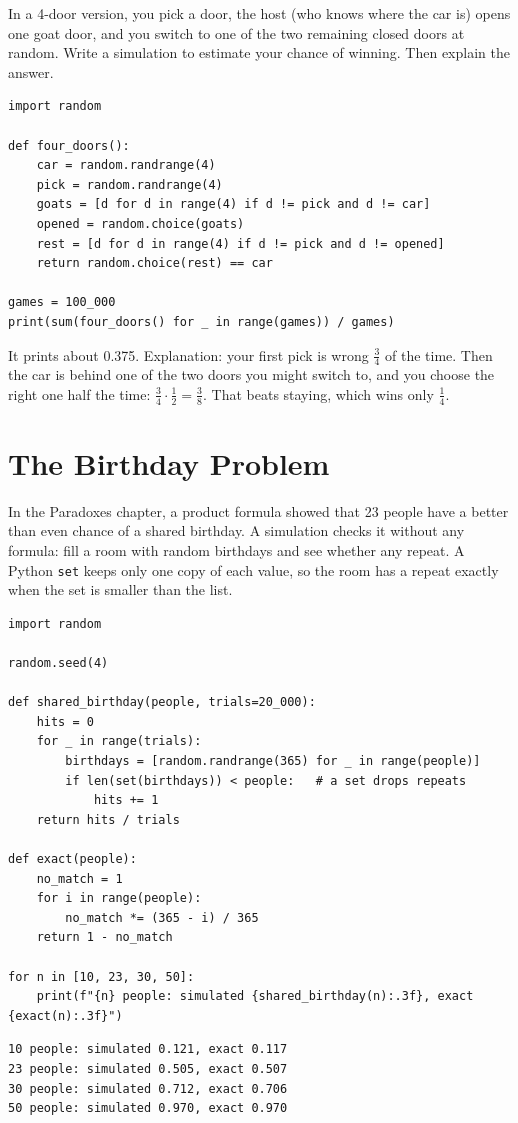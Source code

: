 \begin{Exercise}[title={Four Doors}, label=mc_four]
In a 4-door version, you pick a door, the host (who knows where the car is) opens one
goat door, and you switch to one of the two remaining closed doors at random. Write a
simulation to estimate your chance of winning. Then explain the answer.
\end{Exercise}
\begin{Answer}[ref=mc_four]
\begin{verbatim}
import random

def four_doors():
    car = random.randrange(4)
    pick = random.randrange(4)
    goats = [d for d in range(4) if d != pick and d != car]
    opened = random.choice(goats)
    rest = [d for d in range(4) if d != pick and d != opened]
    return random.choice(rest) == car

games = 100_000
print(sum(four_doors() for _ in range(games)) / games)
\end{verbatim}
It prints about 0.375. Explanation: your first pick is wrong $\frac{3}{4}$ of the time.
Then the car is behind one of the two doors you might switch to, and you choose the
right one half the time: $\frac{3}{4} \cdot \frac{1}{2} = \frac{3}{8}$. That beats staying,
which wins only $\frac{1}{4}$.
\end{Answer}

\section{The Birthday Problem}
In the Paradoxes chapter, a product formula showed that 23 people have a better than
even chance of a shared birthday. A simulation checks it without any formula: fill a
room with random birthdays and see whether any repeat. A Python \texttt{set} keeps only
one copy of each value, so the room has a repeat exactly when the set is smaller than
the list.

\begin{verbatim}
import random

random.seed(4)

def shared_birthday(people, trials=20_000):
    hits = 0
    for _ in range(trials):
        birthdays = [random.randrange(365) for _ in range(people)]
        if len(set(birthdays)) < people:   # a set drops repeats
            hits += 1
    return hits / trials

def exact(people):
    no_match = 1
    for i in range(people):
        no_match *= (365 - i) / 365
    return 1 - no_match

for n in [10, 23, 30, 50]:
    print(f"{n} people: simulated {shared_birthday(n):.3f}, exact {exact(n):.3f}")
\end{verbatim}
\begin{verbatim}
10 people: simulated 0.121, exact 0.117
23 people: simulated 0.505, exact 0.507
30 people: simulated 0.712, exact 0.706
50 people: simulated 0.970, exact 0.970
\end{verbatim}

